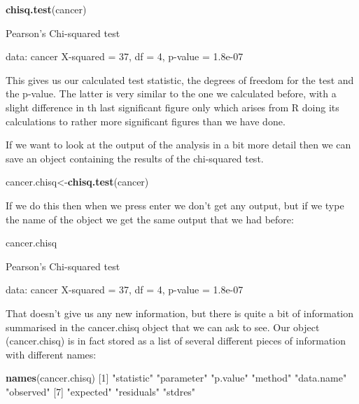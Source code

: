 \documentclass[
]{book}
\newenvironment{Shaded}{\begin{snugshade}}{\end{snugshade}}
\newcommand{\DecValTok}[1]{\textcolor[rgb]{0.00,0.00,0.81}{#1}}
\newcommand{\KeywordTok}[1]{\textcolor[rgb]{0.13,0.29,0.53}{\textbf{#1}}}
\newcommand{\NormalTok}[1]{#1}
\newcommand{\StringTok}[1]{\textcolor[rgb]{0.31,0.60,0.02}{#1}}
\begin{document}
\begin{Shaded}
\begin{Highlighting}[]
\KeywordTok{chisq.test}\NormalTok{(cancer)}

\NormalTok{    Pearson}\StringTok{'s Chi-squared test}

\StringTok{data:  cancer}
\StringTok{X-squared = 37, df = 4, p-value = 1.8e-07}
\end{Highlighting}
\end{Shaded}

This gives us our calculated test statistic, the degrees of freedom for the test and the p-value. The latter is very similar to the one we calculated before, with a slight difference in th last significant figure only which arises from R doing its calculations to rather more significant figures than we have done.

If we want to look at the output of the analysis in a bit more detail then we can save an object containing the results of the chi-squared test.

\begin{Shaded}
\begin{Highlighting}[]
\NormalTok{cancer.chisq<-}\KeywordTok{chisq.test}\NormalTok{(cancer)}
\end{Highlighting}
\end{Shaded}

If we do this then when we press enter we don't get any output, but if we type the name of the object we get the same output that we had before:

\begin{Shaded}
\begin{Highlighting}[]
\NormalTok{cancer.chisq}

\NormalTok{    Pearson}\StringTok{'s Chi-squared test}

\StringTok{data:  cancer}
\StringTok{X-squared = 37, df = 4, p-value = 1.8e-07}
\end{Highlighting}
\end{Shaded}

That doesn't give us any new information, but there is quite a bit of information summarised in the cancer.chisq object that we can ask to see. Our object (cancer.chisq) is in fact stored as a list of several different pieces of information with different names:

\begin{Shaded}
\begin{Highlighting}[]
\KeywordTok{names}\NormalTok{(cancer.chisq)}
\NormalTok{[}\DecValTok{1}\NormalTok{] }\StringTok{"statistic"} \StringTok{"parameter"} \StringTok{"p.value"}   \StringTok{"method"}    \StringTok{"data.name"} \StringTok{"observed"} 
\NormalTok{[}\DecValTok{7}\NormalTok{] }\StringTok{"expected"}  \StringTok{"residuals"} \StringTok{"stdres"}   
\end{Highlighting}
\end{Shaded}
\end{document}
